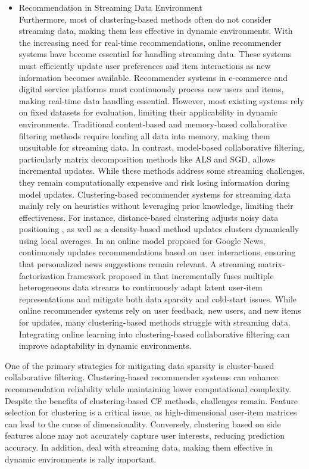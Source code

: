 \documentclass{article}
\theoremstyle{plain}
\theoremstyle{definition}
\theoremstyle{remark}
\begin{document}
\begin{itemize}
\item[c) ] Recommendation in Streaming Data Environment \\
Furthermore, most of clustering-based methods often do not consider streaming data, making them less effective in dynamic environments. With the increasing need for real-time recommendations, online recommender systems have become essential for handling streaming data. These systems must efficiently update user preferences and item interactions as new information becomes available. Recommender systems in e-commerce and digital service platforms must continuously process new users and items, making real-time data handling essential. However, most existing systems rely on fixed datasets for evaluation, limiting their applicability in dynamic environments. Traditional content-based and memory-based collaborative filtering methods require loading all data into memory, making them unsuitable for streaming data. In contrast, model-based collaborative filtering, particularly matrix decomposition methods like ALS and SGD, allows incremental updates. While these methods address some streaming challenges, they remain computationally expensive and risk losing information during model updates. Clustering-based recommender systems for streaming data mainly rely on heuristics without leveraging prior knowledge, limiting their effectiveness. For instance, distance-based clustering adjusts noisy data positioning \cite{georgieva2008dynamic}, as well as a density-based method updates clusters dynamically using local averages\cite{baruah2012evolving}. In \cite{das2007google} an online model proposed for Google News, continuously updates recommendations based on user interactions, ensuring that personalized news suggestions remain relevant. A streaming matrix‐factorization framework proposed in \cite{jakomin2020simultaneous} that incrementally fuses multiple heterogeneous data streams to continuously adapt latent user‐item representations and mitigate both data sparsity and cold‐start issues. While online recommender systems rely on user feedback, new users, and new items for updates, many clustering-based methods struggle with streaming data. Integrating online learning into clustering-based collaborative filtering can improve adaptability in dynamic environments.
\end{itemize}

One of the primary strategies for mitigating data sparsity is cluster-based collaborative filtering. Clustering-based recommender systems can enhance recommendation reliability while maintaining lower computational complexity. Despite the benefits of clustering-based CF methods, challenges remain. Feature selection for clustering is a critical issue, as high-dimensional user-item matrices can lead to the curse of dimensionality. Conversely, clustering based on side features alone may not accurately capture user interests, reducing prediction accuracy. In addition, deal with streaming data, making them effective in dynamic environments is rally important.
\end{document}
